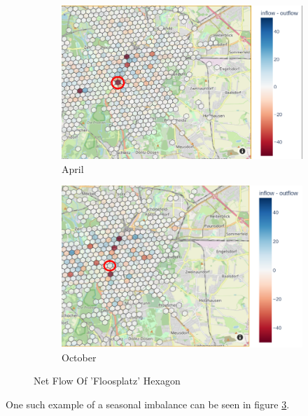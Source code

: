 \begin{figure}[htb]
    \centering
    \begin{subfigure}[b]{0.45\textwidth}
        \includegraphics[width=1\textwidth]{figures/descriptive_analysis/flossplatz_april.png}
        \caption{April}
        \label{fig:descriptive_analysis_flossplatz_april}
    \end{subfigure}
    \begin{subfigure}[b]{0.45\textwidth}
        \includegraphics[width=1\textwidth]{figures/descriptive_analysis/flossplatz_october.png}
        \caption{October}
        \label{fig:descriptive_analysis_flossplatz_october}
    \end{subfigure}
    \caption{Net Flow Of 'Floosplatz' Hexagon}
    \label{fig:descriptive_analysis_flossplatz}
\end{figure}

One such example of a seasonal imbalance can be seen in figure \ref{fig:descriptive_analysis_flossplatz}.


